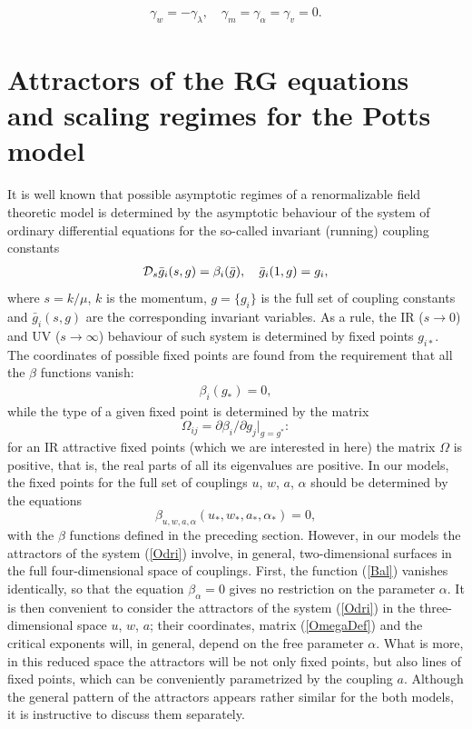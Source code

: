 \documentclass[12pt]{article}
\def\D{{\cal D}}
\begin{document}
\begin{eqnarray}
\gamma_{w} =-\gamma_{\lambda}, \quad
\gamma_{m} =\gamma_{\alpha} =\gamma_{v} = 0.
\label{exi}
\end{eqnarray}


\section{Attractors of the RG equations and scaling regimes for the Potts model} \label{sec:FPS}


It is well known that possible asymptotic regimes of a renormalizable field
theoretic model is determined by the asymptotic behaviour of the system of
ordinary differential equations for the so-called invariant (running)
coupling constants
\begin{eqnarray}
\D_s \bar g_{i}(s,g) = \beta_{i} (\bar g), \quad \bar g_{i}(1,g) = g_{i},
\label{Odri}
\end{eqnarray}
where $s=k/\mu$, $k$ is the momentum,
$g= \{g_{i}\}$ is the full set of coupling constants and
$\bar g_{i}(s,g)$ are the corresponding invariant variables. As a rule,
the IR ($s\to0$) and UV ($s\to\infty$) behaviour of such system is
determined by fixed points $g_{i*}$. The coordinates of possible fixed
points are found from the requirement that all the $\beta$ functions vanish:
\begin{eqnarray}
\beta_{i} (g_{*}) =0,
\label{fp}
\end{eqnarray}
while the type of a given fixed point is determined by the matrix
\begin{equation}
\Omega_{ij} = \partial\beta_{i}/\partial g_{j} |_{g=g^*}:
\label{OmegaDef}
\end{equation}
for an IR attractive fixed points (which we are interested in here) the
matrix $\Omega$ is positive, that is, the real parts of all its eigenvalues
are positive. In our models, the fixed points for the full set of couplings
$u$, $w$, $a$, $\alpha$ should be determined by the equations
\begin{equation}
\beta_{u,w,a,\alpha} (u_{*},w_{*},a_{*},\alpha_{*}) = 0,
\label{points}
\end{equation}
with the $\beta$ functions defined in the preceding section. However, in our
models the attractors of the system (\ref{Odri}) involve, in general,
two-dimensional surfaces in the full four-dimensional space of couplings.
First, the function (\ref{Bal}) vanishes identically, so that the
equation $\beta_{\alpha}=0$ gives no restriction on the parameter $\alpha$.
It is then convenient to consider the attractors of the system (\ref{Odri})
in the three-dimensional space $u$, $w$, $a$; their coordinates, matrix
(\ref{OmegaDef}) and the critical exponents will, in general, depend on
the free parameter $\alpha$. What is more, in this reduced space the
attractors will be not only fixed points, but also lines of fixed points,
which can be conveniently parametrized by the coupling $a$. Although the
general pattern of the attractors appears rather similar for the both
models, it is instructive to discuss them separately.
\end{document}
